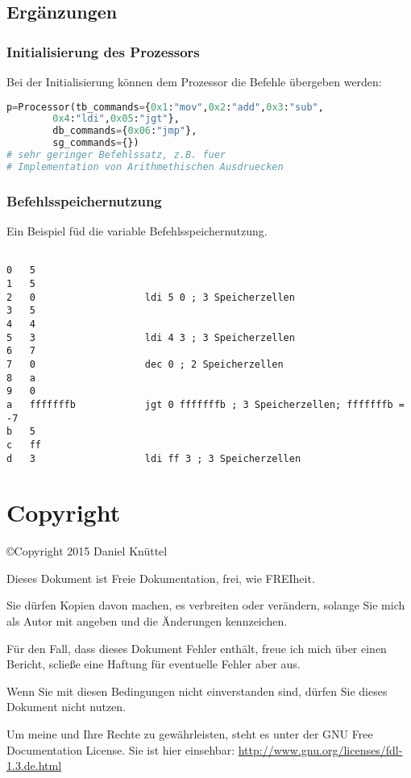 \documentclass[a4paper,12pt,oneside]{scrreprt}
\begin{document}
\chapter{Ergänzungen}
\section{Initialisierung des Prozessors}
\label{sec:processor_init}
Bei der Initialisierung können dem Prozessor die Befehle übergeben werden:

\begin{lstlisting}[language=Python]
p=Processor(tb_commands={0x1:"mov",0x2:"add",0x3:"sub",
		0x4:"ldi",0x05:"jgt"},
		db_commands={0x06:"jmp"},
		sg_commands={})
# sehr geringer Befehlssatz, z.B. fuer 
# Implementation von Arithmethischen Ausdruecken
\end{lstlisting}

\section{Befehlsspeichernutzung}
\label{sec:befehlsspeicher_nutzung}

Ein Beispiel füd die variable Befehlsspeichernutzung.

\begin{lstlisting}

0	5
1	5
2	0			 		ldi 5 0 ; 3 Speicherzellen
3	5
4	4
5	3					ldi 4 3 ; 3 Speicherzellen
6	7
7	0					dec 0 ; 2 Speicherzellen
8	a
9	0
a	fffffffb			jgt 0 fffffffb ; 3 Speicherzellen; fffffffb = -7
b	5
c	ff
d	3					ldi ff 3 ; 3 Speicherzellen

\end{lstlisting}

\part{Copyright}

\copyright Copyright 2015 Daniel Knüttel

Dieses Dokument ist Freie Dokumentation, frei, wie FREIheit.

Sie dürfen Kopien davon machen, es verbreiten oder verändern, solange Sie mich als Autor mit angeben und die Änderungen kennzeichen.

Für den Fall, dass dieses Dokument Fehler enthält, freue ich mich über einen Bericht, scließe eine Haftung für eventuelle Fehler aber aus.

Wenn Sie mit diesen Bedingungen nicht einverstanden sind, dürfen Sie dieses Dokument nicht nutzen.

Um meine und Ihre Rechte zu gewährleisten, steht es unter der GNU Free Documentation License. Sie ist hier einsehbar: \url{http://www.gnu.org/licenses/fdl-1.3.de.html}
\end{document}
